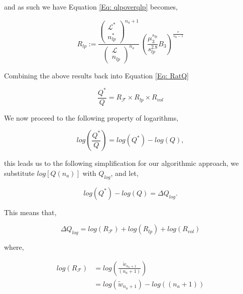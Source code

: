 \documentclass[12pt,letterpaper]{article}
\newcommand{\leng}{\mathcal{L}}
\newcommand{\lr}[1]{\left( #1 \right)}
\newcommand{\lrb}[1]{\left[ #1 \right]}
\newcommand{\fop}{\ensuremath{\mathcal{F}}}
\begin{document}
and as such we have Equation \ref{Eq: qlpoverqlp} becomes,

\begin{equation}
    R_{lp}:=
    \frac{
        \lr{
        \begin{array}{c}
             \leng^{*}\\
             n_{lp}^{*} 
        \end{array}
        }^{n_a+1}   
}{
        \lr{
        \begin{array}{c}
             \leng\\
             n_{lp}
        \end{array}
        }^{n_a}
}
~
\lr{
    \frac{
        \mu_3^{
            s_{lp}
        }
    }{
        s_{lp}^{2.8}
    }
    B_3
}
^{
    \frac{
        r
    }{
        s_{lp}-1
    }
}
\end{equation}


Combining the above results back into Equation \ref{Eq: RatQ}


\begin{equation}
    \frac{
        Q^{*}
    }{
        Q
    }
    =
    R_{\fop}
    \times
    R_{lp}
    \times
    R_{vol}
\label{finalflee}
\end{equation}

We now proceed to the following property of logarithms, 

\begin{equation}
    log
    \lr{
    \frac{
            Q^{*}
        }{
            Q
        }
    }
    =
    log(Q^{*})-log(Q),
\end{equation}

this leads us to the following simplification for our algorithmic approach, we substitute $log\lrb{Q(n_a)}$ with $Q_{log}$, and let,

\begin{equation}
log(Q^{*})
-
log(Q)
=
\Delta Q_{log}.
\label{eq.letdeltaq}
\end{equation}

This means that,

\begin{equation}
    \Delta Q_{log}    
    =
    log\lr{
        R_{\fop}
    }
    +
    log\lr{
        R_{lp}
    }
    +
    log\lr{
        R_{vol}
    }
\end{equation}

where,

\begin{align}
    log
    \lr{
    R_{\fop}
    }
    &=
    log
    \lr{
    \frac{
                \tilde{w}_{n_a+1}       
    }{ 
            (n_a+1)
    }
    }\\
    &=
    log
    \lr{
        \tilde{w}_{n_a+1} 
    }
    -
    log
    \lr{
        (n_a+1)
    }    
   \label{Eq: logRG}
\end{align}
\end{document}
